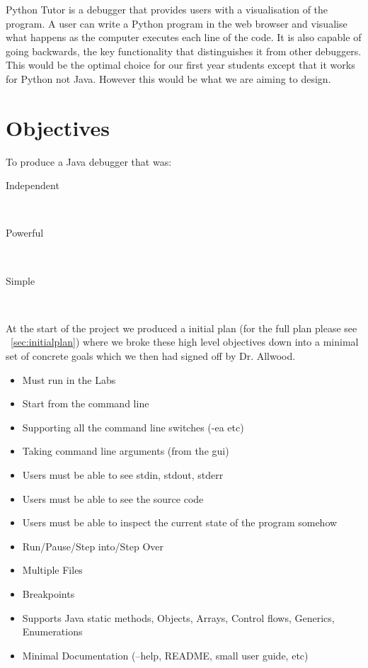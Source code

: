 \documentclass[11pt, a4paper]{article}
\begin{document}
Python Tutor is a debugger that provides users with a visualisation of the program.
A user can write a Python program in the web browser and visualise what happens as the computer executes each line of the code.
It is also capable of going backwards, the key functionality that distinguishes it from other debuggers.
This would be the optimal choice for our first year students except that it works for Python not Java.
However this would be what we are aiming to design.

\section{Objectives} 

To produce a Java debugger that was:

\begin{description}
\item[Independent] \hfill \\
\item[Powerful] \hfill \\
\item[Simple] \hfill \\
\end{description}

At the start of the project we produced a initial plan (for the full plan please see ~\cref{sec:initialplan}) where we broke these high level objectives down into a minimal set of concrete goals which we then had signed off by Dr. Allwood.

\begin{itemize}
\item Must run in the Labs
\item Start from the command line
\item Supporting all the command line switches (-ea etc)
\item Taking command line arguments (from the gui)
\item Users must be able to see stdin, stdout, stderr
\item Users must be able to see the source code
\item Users must be able to inspect the current state of the program somehow
\item Run/Pause/Step into/Step Over
\item Multiple Files
\item Breakpoints
\item Supports Java static methods, Objects, Arrays, Control flows, Generics, Enumerations
\item Minimal Documentation (--help, README, small user guide, etc)
\end{itemize}
\end{document}
